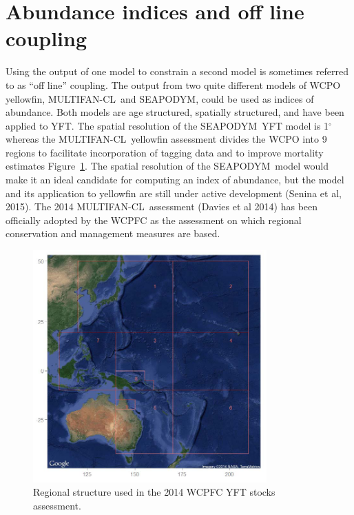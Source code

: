 \documentclass[12pt,letterpaper]{article}
\renewcommand\deg[1]{$^\circ$#1}
\newcommand\SD{SEAPODYM}
\newcommand\MFCL{MULTIFAN-CL}
\begin{document}
\clearpage
\section{Abundance indices and off line coupling}
Using the output of one model to constrain a second model is sometimes
referred to as ``off line'' coupling. 
The output from two quite different models of WCPO yellowfin,
\MFCL\ and \SD, could be used as indices of abundance.
Both models are age structured, spatially structured, and have been
applied to YFT.
The spatial resolution of the \SD\ YFT model is 1\deg{} whereas the
\MFCL\ yellowfin assessment divides the WCPO into 9 regions to facilitate
incorporation of tagging data and to improve mortality estimates
Figure~\ref{fig:mfclregions}.
The spatial resolution of the \SD\ model would make it an ideal
candidate for computing an index of abundance, but the model and its
application to yellowfin are still
under active development (Senina et al, 2015). The 2014 \MFCL\
assessment (Davies et al 2014) has
been officially adopted by the WCPFC as the assessment on which
regional conservation and management measures are based.

\begin{figure}
\begin{center}
\includegraphics[width=0.8\textwidth]{./graphics/MFCLregions.png}
\caption{\label{fig:mfclregions}
Regional structure used in the 2014 WCPFC YFT stocks assessment.
}
\end{center}
\end{figure}
\end{document}
